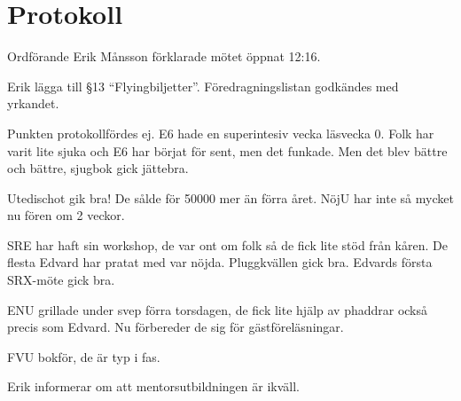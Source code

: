 \documentclass[10pt]{article}
\def\mo{Erik Månsson}
\begin{document}
\section*{Protokoll}
\begin{paragrafer}
Ordförande {\mo} förklarade mötet öppnat 12:16.

{\valavmo}

{\valavms}

{\valavj}

{\tosg}

{\ingaadj}


Erik \ypa lägga till \S13 ``Flyingbiljetter''.
Föredragningslistan godkändes med yrkandet.


\begin{fyllnadsval} %
\end{fyllnadsval}

\begin{paragrafer}
Punkten protokollfördes ej.
E6 hade en superintesiv vecka läsvecka 0. Folk har varit lite sjuka och E6 har börjat för sent, men det funkade. Men det blev bättre och bättre, sjugbok gick jättebra.

Utedischot gik bra! De sålde för 50000 mer än förra året. NöjU har inte så mycket nu fören om 2 veckor.

SRE har haft sin workshop, de var ont om folk så de fick lite stöd från kåren. De flesta Edvard har pratat med var nöjda. Pluggkvällen gick bra. Edvards första SRX-möte gick bra.

ENU grillade under svep förra torsdagen, de fick lite hjälp av phaddrar också precis som Edvard. Nu förbereder de sig för gästföreläsningar.

FVU bokför, de är typ i fas.

Erik informerar om att mentorsutbildningen är ikväll.


\end{paragrafer}
\end{paragrafer}
\end{document}
